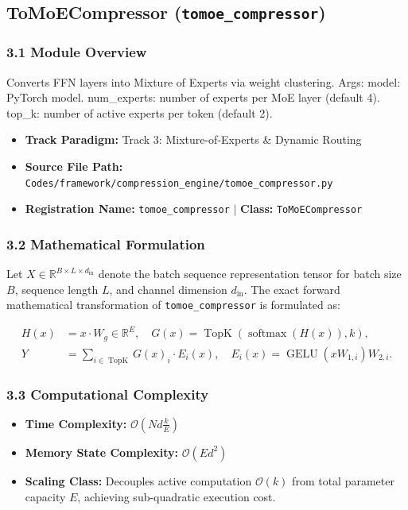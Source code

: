 \subsection{ToMoECompressor (\texttt{tomoe\_compressor})}
\label{sec:app_module_tomoe\_compressor}

\subsubsection*{3.1 Module Overview}
Converts FFN layers into Mixture of Experts via weight clustering.  Args:     model: PyTorch model.     num\_experts: number of experts per MoE layer (default 4).     top\_k: number of active experts per token (default 2).
\begin{itemize}
    \item \textbf{Track Paradigm:} Track 3: Mixture-of-Experts & Dynamic Routing
    \item \textbf{Source File Path:} \texttt{Codes/framework/compression\_engine/tomoe\_compressor.py}
    \item \textbf{Registration Name:} \texttt{tomoe\_compressor} $\mid$ \textbf{Class:} \texttt{ToMoECompressor}
\end{itemize}

\subsubsection*{3.2 Mathematical Formulation}
Let $X \in \mathbb{R}^{B \times L \times d_{\text{in}}}$ denote the batch sequence representation tensor for batch size $B$, sequence length $L$, and channel dimension $d_{\text{in}}$. The exact forward mathematical transformation of \texttt{tomoe\_compressor} is formulated as:

\begin{align}
H(x) &= x \cdot W_g \in \mathbb{R}^{E}, \quad G(x) = \operatorname{TopK}\left(\operatorname{softmax}(H(x)), k\right), \\
Y &= \sum_{i \in \operatorname{TopK}} G(x)_i \cdot E_i(x), \quad E_i(x) = \operatorname{GELU}(x W_{1, i}) W_{2, i}.
\end{align}


\subsubsection*{3.3 Computational Complexity}
\begin{itemize}
    \item \textbf{Time Complexity:} $\mathcal{O}(N d \frac{k}{E})$
    \item \textbf{Memory State Complexity:} $\mathcal{O}(E d^2)$
    \item \textbf{Scaling Class:} Decouples active computation $\mathcal{O}(k)$ from total parameter capacity $E$, achieving sub-quadratic execution cost.
\end{itemize}

